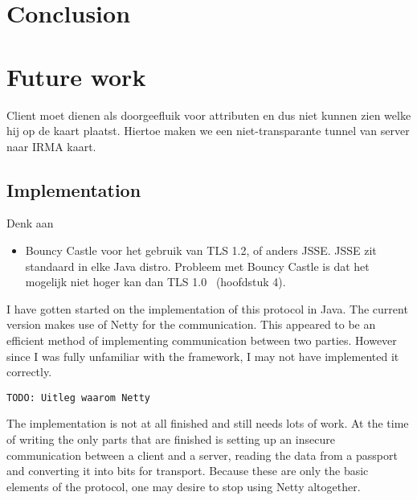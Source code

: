 \section{Conclusion}
\label{sec:conclusion}

\section{Future work}
\label{sec:futurework}

Client moet dienen als doorgeefluik voor attributen en dus niet kunnen zien welke hij op de kaart plaatst. Hiertoe maken we een niet-transparante tunnel van server naar IRMA kaart.

\subsection{Implementation}
Denk aan
\begin{itemize}
	\item Bouncy Castle voor het gebruik van TLS 1.2, of anders JSSE. JSSE zit standaard in elke Java distro. Probleem met Bouncy Castle is dat het mogelijk niet hoger kan dan TLS 1.0~\cite{sslanalysis} (hoofdstuk 4). 
\end{itemize}

I have gotten started on the implementation of this protocol in Java. The current version makes use of Netty for the communication. This appeared to be an efficient method of implementing communication between two parties. However since I was fully unfamiliar with the framework, I may not have implemented it correctly.

\texttt{TODO: Uitleg waarom Netty}

The implementation is not at all finished and still needs lots of work. At the time of writing the only parts that are finished is setting up an insecure communication between a client and a server, reading the data from a passport and converting it into bits for transport. Because these are only the basic elements of the protocol, one may desire to stop using Netty altogether.
